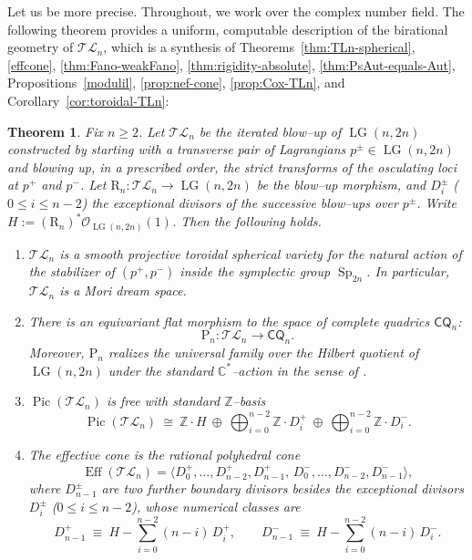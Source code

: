 \documentclass[10pt]{amsart}
\theoremstyle{definition}
\newcommand{\OO}{\mathcal{O}}
\newcommand{\Pic}{\operatorname{Pic}}
\newcommand{\Eff}{\operatorname{Eff}}
\newcommand{\LG}{\operatorname{LG}}
\newcommand{\CQ}{\mathsf{CQ}}
\DeclareMathOperator{\Sp}{Sp}
\newcommand{\TL}{\mathcal{TL}}
\newcommand{\ZZ}{\mathbb{Z}}
\newcommand{\RL}{\mathrm{R}}
\newcommand{\PL}{\mathrm{P}}
\theoremstyle{plain} %
\newtheorem{theoremABC}{Theorem}
\begin{document}
Let us be more precise. Throughout, we work over the complex number field. The following theorem provides a uniform, computable description of the birational geometry of $\TL_n$, which is a synthesis of Theorems~\ref{thm:TLn-spherical}, \ref{effcone}, \ref{thm:Fano-weakFano}, \ref{thm:rigidity-absolute}, \ref{thm:PsAut-equals-Aut}, Propositions~\ref{modulil}, \ref{prop:nef-cone}, \ref{prop:Cox-TLn}, and Corollary~\ref{cor:toroidal-TLn}:

\begin{theoremABC}\label{thm:A}
Fix $n\ge 2$. Let $\TL_n$ be the iterated blow--up of $\LG(n,2n)$ constructed by starting with a transverse pair of Lagrangians $p^\pm\in \LG(n,2n)$ and  blowing up, in a prescribed order, the strict transforms of the osculating loci at $p^+$ and $p^-$. Let $\RL_n\colon\TL_n\longrightarrow \LG(n,2n)$ be the blow--up morphism, and $D_i^\pm$ ($0\leq i\leq n-2$) the exceptional divisors of the successive blow--ups over $p^\pm$.  Write $H:=(\RL_n)^*\OO_{\LG(n,2n)}(1)$.  Then the following holds.

\begin{enumerate}

\item $\TL_n$ is a smooth projective toroidal spherical variety for the natural action of the stabilizer of $(p^+,p^-)$ inside the symplectic group $\Sp_{2n}$. In particular, $\TL_n$ is a Mori dream space.

\item There is an equivariant flat morphism to the space of complete quadrics $\CQ_n$:
\begin{equation}\label{pln}
\PL_n \colon \TL_n \longrightarrow \CQ_n.
\end{equation}
Moreover, $\PL_n$ realizes the universal family over the Hilbert quotient of $\LG(n,2n)$ under the standard $\mathbb C^*$--action in the sense of \cite{BS,Kap}.

\item $\Pic(\TL_n)$ is free with standard $\mathbb Z$--basis
\[
\Pic(\TL_n)\ \cong\ \ZZ\!\cdot H\ \oplus\ \bigoplus_{i=0}^{n-2}\ZZ\!\cdot D_i^+\ \oplus\ \bigoplus_{i=0}^{n-2}\ZZ\!\cdot D_i^- .
\]

 

\item The effective cone is the rational polyhedral cone
\[
\Eff(\TL_n)=\bigl\langle D_0^+,\dots,D_{n-2}^+,D_{n-1}^+,\,D_0^-,\dots,D_{n-2}^-,D_{n-1}^-\bigr\rangle,
\]
where $D_{n-1}^{\pm}$ are two further boundary divisors besides the exceptional divisors $D_i^\pm$ ($0\le i\le n-2$), whose numerical classes are
$$
D_{n-1}^+\ \equiv\ H-\sum_{i=0}^{n-2}(n-i)\,D_i^+,
\qquad
D_{n-1}^-\ \equiv\ H-\sum_{i=0}^{n-2}(n-i)\,D_i^-.
$$


\end{enumerate}
\end{theoremABC}
\end{document}
